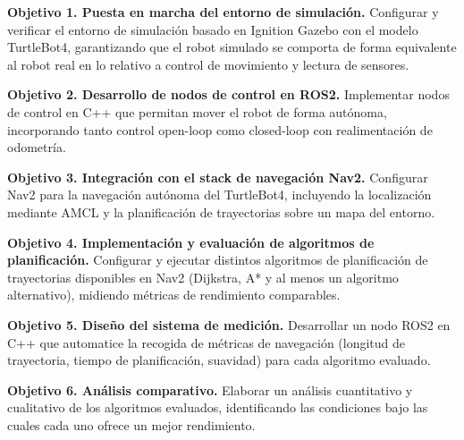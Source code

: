\begin{description}

\item \textbf{Objetivo 1. Puesta en marcha del entorno de simulación.}
Configurar y verificar el entorno de simulación basado en Ignition Gazebo con el modelo TurtleBot4, garantizando que el robot simulado se comporta de forma equivalente al robot real en lo relativo a control de movimiento y lectura de sensores.

\item \textbf{Objetivo 2. Desarrollo de nodos de control en ROS2.}
Implementar nodos de control en C++ que permitan mover el robot de forma autónoma, incorporando tanto control open-loop como closed-loop con realimentación de odometría.

\item \textbf{Objetivo 3. Integración con el stack de navegación Nav2.}
Configurar Nav2 para la navegación autónoma del TurtleBot4, incluyendo la localización mediante AMCL y la planificación de trayectorias sobre un mapa del entorno.

\item \textbf{Objetivo 4. Implementación y evaluación de algoritmos de planificación.}
Configurar y ejecutar distintos algoritmos de planificación de trayectorias disponibles en Nav2 (Dijkstra, A* y al menos un algoritmo alternativo), midiendo métricas de rendimiento comparables.

\item \textbf{Objetivo 5. Diseño del sistema de medición.}
Desarrollar un nodo ROS2 en C++ que automatice la recogida de métricas de navegación (longitud de trayectoria, tiempo de planificación, suavidad) para cada algoritmo evaluado.

\item \textbf{Objetivo 6. Análisis comparativo.}
Elaborar un análisis cuantitativo y cualitativo de los algoritmos evaluados, identificando las condiciones bajo las cuales cada uno ofrece un mejor rendimiento.

\end{description}